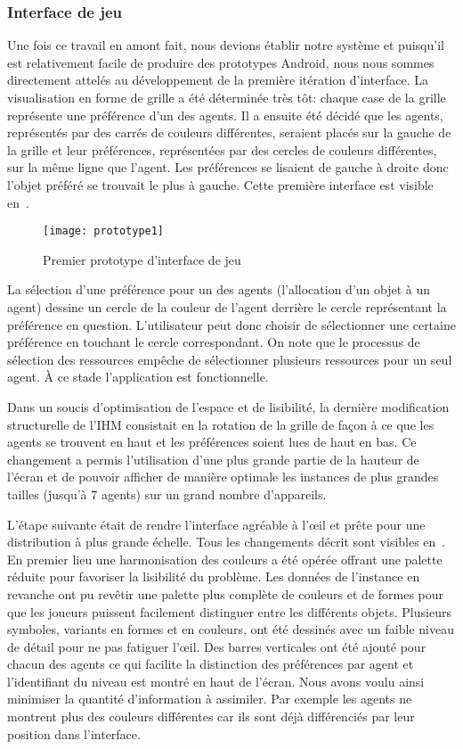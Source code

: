 \documentclass[../main.tex]{subfiles}
\begin{document}
	\subsubsection{Interface de jeu}

Une fois ce travail en amont fait, nous devions établir notre système et puisqu'il est relativement facile de produire des prototypes Android, nous nous sommes directement attelés au développement de la première itération d'interface. La visualisation en forme de grille a été déterminée très tôt: chaque case de la grille représente une préférence d'un des agents. Il a ensuite été décidé que les agents, représentés par des carrés de couleurs différentes, seraient placés sur la gauche de la grille et leur préférences, représentées par des cercles de couleurs différentes, sur la même ligne que l'agent. Les préférences se lisaient de gauche à droite donc l'objet préféré se trouvait le plus à gauche. Cette première interface est visible en~.

\begin{figure}[ht!]
\centering
\texttt{[image: prototype1]}
\caption{Premier prototype d'interface de jeu}
\label{fig-prototype1}
\end{figure}

La sélection d'une préférence pour un des agents (l'allocation d'un objet à un agent) dessine un cercle de la couleur de l'agent derrière le cercle représentant la préférence en question. L'utilisateur peut donc choisir de sélectionner une certaine préférence en touchant le cercle correspondant. On note que le processus de sélection des ressources empêche de sélectionner plusieurs ressources pour un seul agent. À ce stade l'application est fonctionnelle.

Dans un soucis d'optimisation de l'espace et de lisibilité, la dernière modification structurelle de l'IHM consistait en la rotation de la grille de façon à ce que les agents se trouvent en haut et les préférences soient lues de haut en bas. Ce changement a permis l'utilisation d'une plus grande partie de la hauteur de l'écran et de pouvoir afficher de manière optimale les instances de plus grandes tailles (jusqu'à 7 agents) sur un grand nombre d'appareils.

L'étape suivante était de rendre l'interface agréable à l'œil et prête pour une distribution à plus grande échelle. Tous les changements décrit sont visibles en~. En premier lieu une harmonisation des couleurs a été opérée offrant une palette réduite pour favoriser la lisibilité du problème. Les données de l'instance en revanche ont pu revêtir une palette plus complète de couleurs et de formes pour que les joueurs puissent facilement distinguer entre les différents objets. Plusieurs symboles, variants en formes et en couleurs, ont été dessinés avec un faible niveau de détail pour ne pas fatiguer l'œil. Des barres verticales ont été ajouté pour chacun des agents ce qui facilite la distinction des préférences par agent et l'identifiant du niveau est montré en haut de l'écran. Nous avons voulu ainsi minimiser la quantité d'information à assimiler. Par exemple les agents ne montrent plus des couleurs différentes car ils sont déjà différenciés par leur position dans l'interface.
\end{document}
